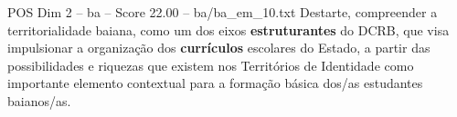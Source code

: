 \begin{textsample}{POS Dim 2 – ba – Score 22.00 – ba/ba\_em\_10.txt}
Destarte, compreender a territorialidade baiana, como um dos eixos \textbf{estruturantes} do DCRB, que visa impulsionar a organização dos \textbf{currículos} escolares do Estado, a partir das possibilidades e riquezas que existem nos Territórios de Identidade como importante elemento contextual para a formação básica dos/as estudantes baianos/as.

\end{textsample}
